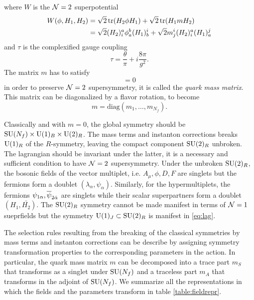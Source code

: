     where $W$ is the $\mathcal{N}=2$ superpotential
    \begin{align}
        W(\phi,H_1,H_2) &= \sqrt{2}\tr(H_2\phi H_1) + \sqrt{2}\tr(H_1mH_2) \\
        &= \sqrt{2}(H_2)^a_i\phi^b_a (H_1)^i_b + \sqrt{2}m^i_j(H_2)^a_i(H_1)^j_a
    \end{align}
    and $\tau$ is the complexified gauge coupling
    \begin{equation}
        \tau=\frac{\theta}{\pi}+i\frac{8\pi}{g^2}.
    \end{equation}
    The matrix $m$ has to satisfy
    \begin{equation}
        [m,m^\dagger]=0
    \end{equation}
    in order to preserve $\mathcal{N}=2$ supersymmetry, it is called the \emph{quark mass matrix}. This matrix can be diagonalized by a flavor rotation, to become
    \begin{equation}
        m=\text{diag}(m_1,\dots,m_{N_f}).
    \end{equation}

    Classically and with $m=0$, the global symmetry should be $\text{SU}(N_f)\times\text{U}(1)_B\times\text{U}(2)_R$. The mass terms and instanton corrections breaks $\text{U}(1)_R$ of the $R$-symmetry, leaving the compact component $\text{SU}(2)_R$ unbroken. The lagrangian should be invariant under the latter, it is a necessary and sufficient condition to have $\mathcal{N}=2$ supersymmetry. Under the unbroken $\text{SU}(2)_R$, the bosonic fields of the vector multiplet, i.e. $A_\mu,\phi,D,F$ are singlets but the fermions form a doublet $(\lambda_\alpha,\psi_\alpha)$. Similarly, for the hypermultiplets, the fermions $\psi_{1\alpha},\overline{\psi}_{2\dot{\alpha}}$ are singlets while their scalar superpartners form a doublet $(H_1,\bar{H_2})$. The $\text{SU}(2)_R$ symmetry cannot be made manifest in terms of $\mathcal{N}=1$ sueprfields but the symmetry $\text{U}(1)_J\subset\text{SU}(2)_R$ is manifest in \eqref{eq:lag}.
    
    The selection rules resulting from the breaking of the classical symmetries by mass terms and instanton corrections can be describe by assigning symmetry transformation properties to the corresponding parameters in the action. In particular, the quark mass matrix $m$ can be decomposed into a trace part $m_S$ that transforms as a singlet under $\text{SU}(N_f)$ and a traceless part $m_A$ that transforms in the adjoint of $\text{SU}(N_f)$. We summarize all the representations in which the fields and the parameters transform in table \ref{table:fieldrepr}.

